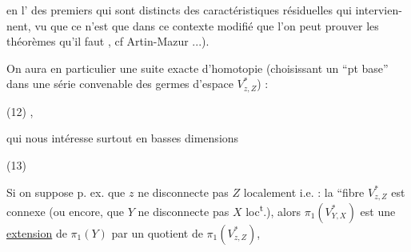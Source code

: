 en l' des  premiers qui sont distincts
des caractéristiques résiduelles qui intervien-
nent, vu que ce n'est que dans ce
contexte modifié que l'on peut prouver
les théorèmes qu'il faut ,
cf Artin-Mazur ...).

On aura en particulier une suite
exacte d'homotopie  (choisissant
un  ``pt base'' dans une série
convenable  des germes d'espace $V^*_{z,Z}$) :

\noindent (12)
,

qui nous intéresse surtout en basses
dimensions

\noindent (13)

Si on suppose p. ex. que $z$ ne disconnecte
pas $Z$ localement i.e. :  la ``fibre $V^*_{z,Z}$ est connexe
(ou encore, que $Y$ ne disconnecte pas $X$
loc\textsuperscript{t}.), alors $\pi_1(V^*_{Y,X})$ est une \uline{extension}
de $\pi_1(Y)$ par un quotient de $\pi_1(V^*_{z,Z})$, 
